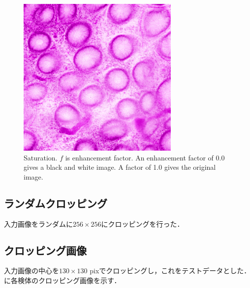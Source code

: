 \begin{figure}[H]
\begin{minipage}{0.25\columnwidth}
	\end{minipage}
	\begin{minipage}{0.25\columnwidth}
		\centering
		\includegraphics[clip, width=\linewidth]{fig/preprocessing/data_aug/color/SATURATION/SATURATION_1_50}
	\end{minipage}	
	
	\caption{Saturation. $f$ is enhancement factor. An enhancement factor of 0.0 gives a black and white image. A factor of 1.0 gives the original image.}
	\label{fig:彩度}
	
\end{figure}

\subsection*{ランダムクロッピング}
入力画像をランダムに$256 \times 256$にクロッピングを行った．

\subsection{クロッピング画像}
入力画像の中心を$130\times 130$ pixでクロッピングし，これをテストデータとした．に各検体のクロッピング画像を示す．

